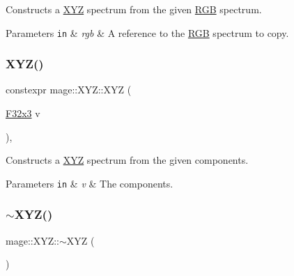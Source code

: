 Constructs a \mbox{\hyperlink{structmage_1_1_x_y_z}{X\+YZ}} spectrum from the given \mbox{\hyperlink{structmage_1_1_r_g_b}{R\+GB}} spectrum.


\begin{DoxyParams}[1]{Parameters}
\mbox{\tt in}  & {\em rgb} & A reference to the \mbox{\hyperlink{structmage_1_1_r_g_b}{R\+GB}} spectrum to copy. \\
\hline
\end{DoxyParams}
\mbox{\label{structmage_1_1_x_y_z_af2edf71f76a8c7d457229adaf904fb07}} 
\subsubsection{\texorpdfstring{X\+Y\+Z()}{XYZ()}\hspace{0.1cm}{\footnotesize\ttfamily [6/6]}}
{\footnotesize\ttfamily constexpr mage\+::\+X\+Y\+Z\+::\+X\+YZ (\begin{DoxyParamCaption}\item[{\mbox{\hyperlink{namespacemage_a1e3c7a882af461f161caa1cbddaf1fa2}{F32x3}}}]{v }\end{DoxyParamCaption})\hspace{0.3cm}{\ttfamily [explicit]}, {\ttfamily [noexcept]}}

Constructs a \mbox{\hyperlink{structmage_1_1_x_y_z}{X\+YZ}} spectrum from the given components.


\begin{DoxyParams}[1]{Parameters}
\mbox{\tt in}  & {\em v} & The components. \\
\hline
\end{DoxyParams}
\mbox{\label{structmage_1_1_x_y_z_a07eb7ce1ad3308774b0bbad3a7f121ce}} 
\subsubsection{\texorpdfstring{$\sim$\+X\+Y\+Z()}{~XYZ()}}
{\footnotesize\ttfamily mage\+::\+X\+Y\+Z\+::$\sim$\+X\+YZ (\begin{DoxyParamCaption}{ }\end{DoxyParamCaption})\hspace{0.3cm}{\ttfamily [default]}}

